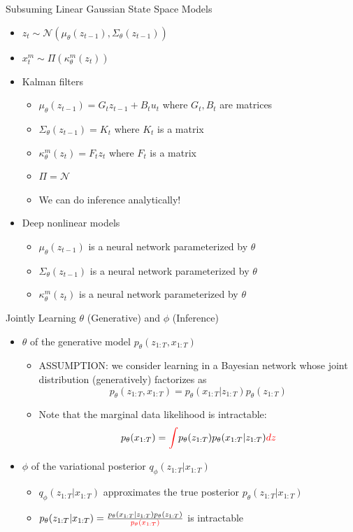 \documentclass{beamer}
\begin{document}
\begin{frame}{Subsuming Linear Gaussian State Space Models}
\begin{itemize}
\item $z_t\sim\mathcal{N}(\mu_\theta(z_{t-1}),\Sigma_\theta(z_{t-1}))$
\item $x_t^m\sim\Pi(\kappa_\theta^m(z_t))$
\item Kalman filters
\begin{itemize}
\item $\mu_\theta(z_{t-1})=G_tz_{t-1}+B_tu_t$ where $G_t, B_t$ are matrices
\item $\Sigma_\theta(z_{t-1})=K_t$ where $K_t$ is a matrix
\item $\kappa_\theta^m(z_t)=F_tz_t$ where $F_t$ is a matrix
\item $\Pi=\mathcal{N}$
\item We can do inference analytically!
\end{itemize}
\item Deep nonlinear models 
\begin{itemize}
\item $\mu_\theta(z_{t-1})$ is a neural network parameterized by $\theta$
\item $\Sigma_\theta(z_{t-1})$ is a neural network parameterized by $\theta$
\item $\kappa_\theta^m(z_t)$ is a neural network parameterized by $\theta$
\end{itemize}
\end{itemize}
\end{frame}

\begin{frame}{Jointly Learning $\theta$ (Generative) and $\phi$ (Inference)}
\begin{itemize}
\item $\theta$ of the generative model $p_\theta(z_{1:T},x_{1:T})$
\begin{itemize}
\item ASSUMPTION: we consider learning in a Bayesian network whose joint distribution (generatively) factorizes as\[
p_\theta(z_{1:T},x_{1:T})=p_\theta(x_{1:T}|z_{1:T})p_\theta(z_{1:T})
\]
\item Note that the marginal data likelihood is intractable:\[
p_\theta(x_{1:T})=\textcolor{red}{\int} p_\theta(z_{1:T})p_\theta(x_{1:T}|z_{1:T})\textcolor{red}{dz}
\]
\end{itemize}
\item $\phi$ of the variational posterior $q_\phi(z_{1:T}|x_{1:T})$
\begin{itemize}
\item $q_\phi(z_{1:T}|x_{1:T})$ approximates the true posterior $p_\theta(z_{1:T}|x_{1:T})$
\item $p_\theta(z_{1:T}|x_{1:T})=\frac{p_\theta(x_{1:T}|z_{1:T})p_\theta(z_{1:T})}{\textcolor{red}{p_\theta(x_{1:T})}}$ is intractable
\end{itemize}
\end{itemize}
\end{frame}
\end{document}
